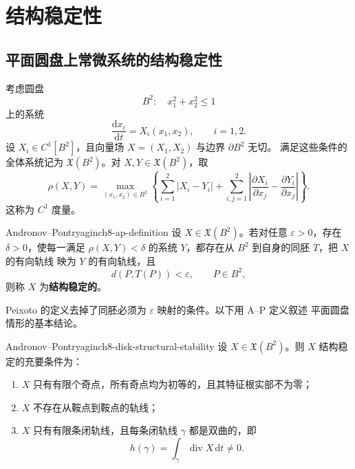 
\setchapterimage{}
\setchapterintro{}
\chapter{结构稳定性}

\newcommand{\chEightFigurePlaceholder}[1]{%
  \begin{center}
    \fbox{\parbox{0.72\textwidth}{\centering\vspace{1.7cm}图~#1\\（图片占位）\vspace{1.7cm}}}
  \end{center}%
}

\section{平面圆盘上常微系统的结构稳定性}

考虑圆盘
\[
  B^2:\quad x_1^2+x_2^2\leq1
\]
上的系统
\[
  \dfrac{\mathrm dx_i}{\mathrm dt}=X_i(x_1,x_2),\qquad i=1,2. \tag{1.1}
\]
设 $X_i\in C^1[B^2]$，且向量场 $X=(X_1,X_2)$ 与边界 $\partial B^2$ 无切。
满足这些条件的全体系统记为 $\mathfrak X(B^2)$。对 $X,Y\in\mathfrak X(B^2)$，取
\[
 \rho(X,Y)=\max_{(x_1,x_2)\in B^2}\left\{
 \sum_{i=1}^2|X_i-Y_i|+
 \sum_{i,j=1}^2\left|\dfrac{\partial X_i}{\partial x_j}
 -\dfrac{\partial Y_i}{\partial x_j}\right|\right\}. \tag{1.2}
\]
这称为 $C^1$ 度量。

\begin{definition}{Andronov--Pontryagin}{ch8-ap-definition}
设 $X\in\mathfrak X(B^2)$。若对任意 $\varepsilon>0$，存在 $\delta>0$，使每一满足
$\rho(X,Y)<\delta$ 的系统 $Y$，都存在从 $B^2$ 到自身的同胚 $T$，把 $X$ 的有向轨线
映为 $Y$ 的有向轨线，且
\[
 d(P,T(P))<\varepsilon,\qquad P\in B^2,
\]
则称 $X$ 为\textbf{结构稳定的}。
\end{definition}

Peixoto 的定义去掉了同胚必须为 $\varepsilon$ 映射的条件。以下用 A--P 定义叙述
平面圆盘情形的基本结论。

\begin{theorem}{Andronov--Pontryagin}{ch8-disk-structural-stability}
设 $X\in\mathfrak X(B^2)$。则 $X$ 结构稳定的充要条件为：

\begin{enumerate}
  \item $X$ 只有有限个奇点，所有奇点均为初等的，且其特征根实部不为零；
  \item $X$ 不存在从鞍点到鞍点的轨线；
  \item $X$ 只有有限条闭轨线，且每条闭轨线 $\gamma$ 都是双曲的，即
  \[
     h(\gamma)=\int_\gamma\operatorname{div}X\,\mathrm dt\ne0.
  \]
\end{enumerate}
\end{theorem}

